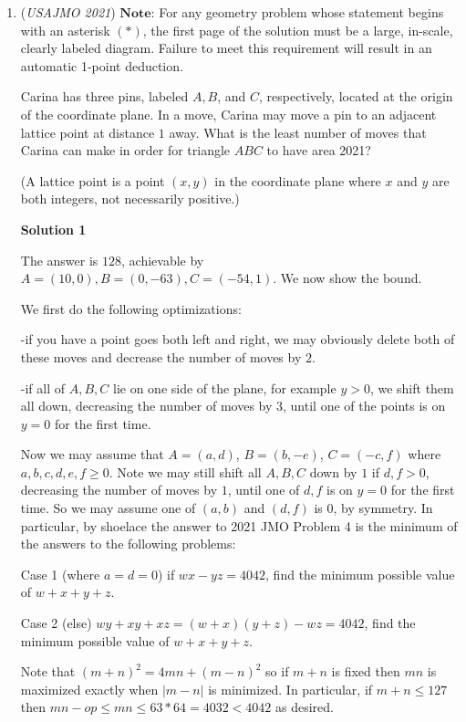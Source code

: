 \begin{enumerate}
 


	\item (\textit{USAJMO 2021}) $\textbf{Note:}$ For any geometry problem whose statement begins with an asterisk $(*)$, the first page of the solution must be a large, in-scale, clearly labeled diagram. Failure to meet this requirement will result in an automatic 1-point deduction.


 Carina has three pins, labeled $A, B$, and $C$, respectively, located at the origin of the coordinate plane. In a move, Carina may move a pin to an adjacent lattice point at distance $1$ away. What is the least number of moves that Carina can make in order for triangle $ABC$ to have area 2021? 


 (A lattice point is a point $(x, y)$ in the coordinate plane where $x$ and $y$ are both integers, not necessarily positive.) 


 



\textbf{Solution 1}

The answer is $128$, achievable by $A=(10,0), B=(0,-63), C=(-54,1)$. We now show the bound.

 We first do the following optimizations:

 -if you have a point goes both left and right, we may obviously delete both of these moves and decrease the number of moves by $2$.

 -if all of $A,B,C$ lie on one side of the plane, for example $y>0$, we shift them all down, decreasing the number of moves by $3$, until one of the points is on $y=0$ for the first time.

 Now we may assume that $A=(a,d)$, $B=(b,-e)$, $C=(-c,f)$ where $a,b,c,d,e,f \geq 0$. Note we may still shift all $A,B,C$ down by $1$ if $d,f>0$, decreasing the number of moves by $1$, until one of $d,f$ is on $y=0$ for the first time. So we may assume one of $(a,b)$ and $(d,f)$ is $0$, by symmetry. In particular, by shoelace the answer to 2021 JMO Problem 4 is the minimum of the answers to the following problems:

 
Case 1 (where $a=d=0$) if $wx-yz=4042$, find the minimum possible value of $w+x+y+z$.

 Case 2 (else) $wy+xy+xz=(w+x)(y+z)-wz=4042$, find the minimum possible value of $w+x+y+z$.

 
Note that $(m+n)^2=4mn+(m-n)^2$ so if $m+n$ is fixed then $mn$ is maximized exactly when $|m-n|$ is minimized. In particular, if $m+n \leq 127$ then $mn-op \leq mn \leq 63*64 = 4032 <4042$ as desired.


\end{enumerate}
